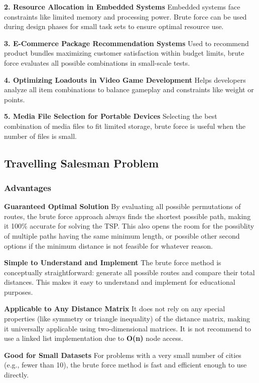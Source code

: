 \textbf{2. Resource Allocation in Embedded Systems }
Embedded systems face constraints like limited memory and processing power. Brute force can be used during design phases for small task sets to ensure optimal resource use. 

\textbf{3. E-Commerce Package Recommendation Systems }
Used to recommend product bundles maximizing customer satisfaction within budget limits, brute force evaluates all possible combinations in small-scale tests. 

\textbf{4. Optimizing Loadouts in Video Game Development }
Helps developers analyze all item combinations to balance gameplay and constraints like weight or points. 

\textbf{5. Media File Selection for Portable Devices }
Selecting the best combination of media files to fit limited storage, brute force is useful when the number of files is small.

\subsection{Travelling Salesman Problem}
\subsubsection{Advantages}
\textbf{Guaranteed Optimal Solution} 
By evaluating all possible permutations of routes, the brute force approach always finds the shortest possible path, making it 100\% accurate for solving the TSP. This also opens the room for the possiblity of multiple paths having the same minimum length, or possible other second options if the minimum distance is not feasible for whatever reason.

\textbf{Simple to Understand and Implement} 
The brute force method is conceptually straightforward: generate all possible routes and compare their total distances. This makes it easy to understand and implement for educational purposes. 

\textbf{Applicable to Any Distance Matrix} 
It does not rely on any special properties (like symmetry or triangle inequality) of the distance matrix, making it universally applicable using two-dimensional matrices. It is not recommend to use a linked list implementation due to \textbf{O(n)} node access.

\textbf{Good for Small Datasets} 
For problems with a very small number of cities (e.g., fewer than 10), the brute force method is fast and efficient enough to use directly. 

